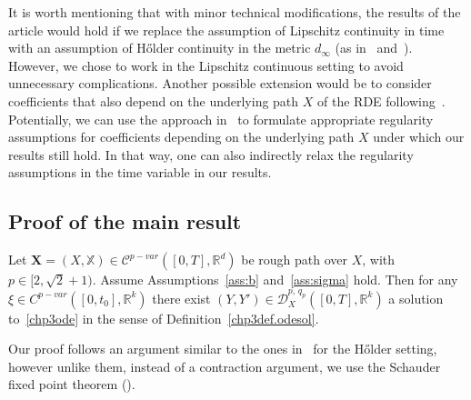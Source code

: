 \documentclass[AHL,Unicode,longabstracts,published]{cedram}
\newcommand{\scrD}{\mathscr{D}}
\newcommand{\bbX}{\mathbb{X}}
\newcommand{\calC}{\mathcal{C}}
\newcommand{\Rr}{{\mathbb{R}}}
\begin{document}
\begin{rema}\label{rem:timeholder}
It is worth mentioning that with minor technical modifications, the results of the article would hold if we replace the assumption of Lipschitz continuity in time with an assumption of H\H older continuity in the metric $d_{\infty}$ (as in~\cite{ContKalinin} and~\cite{Kalinin}). However, we chose to work in the Lipschitz continuous setting to avoid unnecessary complications. Another possible extension would be to consider coefficients that also depend on the underlying path $X$ of the RDE following~\cite{KellerZhang}. Potentially, we can use the approach in~\cite{KellerZhang} to formulate appropriate regularity assumptions for coefficients depending on the underlying path $X$ under which our results still hold. In that way, one can also indirectly relax the regularity assumptions in the time variable in our results.
\end{rema}

\subsection{Proof of the main result}

\begin{theo}\label{chp3theorem:existence}
Let $\bm{X}=(X, \bbX)\in \calC^{p-var}([0,T],\Rr^d)$ be rough path over $X$, with $p\in [2, \sqrt{2}+1)$. Assume Assumptions~\ref{ass:b} and~\ref{ass:sigma} hold. Then for any $\xi\in C^{p-var}([0,t_0],\Rr^k)$ there exist $(Y,Y')\in\scrD^{p,\,q_p}_{X }([0,T],\Rr^k)$ a solution to~\eqref{chp3ode} in the sense of Definition~\ref{chp3def.odesol}.
\end{theo}

Our proof follows an argument similar to the ones in~\cite{frizhairer} for the H\H older setting, however unlike them, instead of a contraction argument, we use the Schauder fixed point theorem (\cite[Theorem~11.1]{GilbTrud}).
\end{document}
